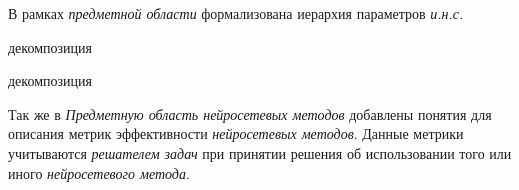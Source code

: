 В рамках \textit{предметной области} формализована иерархия параметров \textit{и.н.с.}
\begin{SCn}
	\begin{scnindent}
		\begin{scneqtoset}
			\begin{scnrelfromset}{декомпозиция}
			\end{scnrelfromset}
			\begin{scnrelfromset}{декомпозиция}
			\end{scnrelfromset}
		\end{scneqtoset}
	\end{scnindent}
\end{SCn}

Так же в \textit{Предметную область нейросетевых методов} добавлены понятия для описания метрик эффективности \textit{нейросетевых методов}. Данные метрики учитываются \textit{решателем задач} при принятии решения об использовании того или иного \textit{нейросетевого метода}.

